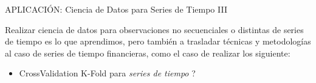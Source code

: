 \documentclass{bredelebeamer}
\begin{document}
\begin{frame}{APLICACI\'ON: Ciencia de Datos para Series de Tiempo III}

Realizar ciencia de datos para observaciones no secuenciales o distintas de series de
tiempo es lo que aprendimos, pero tambi\'en a trasladar t\'ecnicas y metodolog\'ias al
caso de series de tiempo financieras, como el caso de realizar los siguiente:

\begin{itemize}

  \item CrossValidation K-Fold para \textit{series de tiempo} ?

\end{itemize}


\end{frame}

\end{document}
